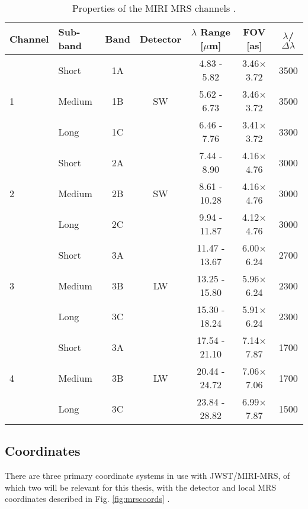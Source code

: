 \begin{table}[t]
	\begin{small}
	\centering
	\begin{tabular}{l|lc|cccc}
		\toprule
		\textbf{Channel} & \textbf{Sub-band} & \textbf{Band} & \textbf{Detector} & $\lambda$ \textbf{Range [$\mu$m]} & \textbf{FOV [as]} & $\lambda$/$\Delta\lambda$\\
		\midrule
		\multirow{3}{*}{1}  &Short & 1A & \multirow{3}{*}{SW}   & 4.83 - 5.82 & 3.46$\times$3.72 & 3500 \\
							&Medium & 1B &						& 5.62 - 6.73 & 3.46$\times$3.72 & 3500 \\
							& Long & 1C&						& 6.46 - 7.76 & 3.41$\times$3.72 & 3300 \\
		\midrule
		\multirow{3}{*}{2}  &Short & 2A & \multirow{3}{*}{SW}   & 7.44 - 8.90 & 4.16$\times$4.76 & 3000 \\
							&Medium & 2B &						& 8.61 - 10.28 & 4.16$\times$4.76 & 3000 \\
							& Long & 2C&						& 9.94 - 11.87 & 4.12$\times$4.76 & 3000 \\
		\midrule
		\multirow{3}{*}{3}  &Short & 3A & \multirow{3}{*}{LW}   & 11.47 - 13.67 & 6.00$\times$6.24 & 2700 \\
							&Medium & 3B &						& 13.25 - 15.80 & 5.96$\times$6.24 & 2300 \\
							& Long & 3C&						& 15.30 - 18.24 & 5.91$\times$6.24 & 2300 \\		
		\midrule
		\multirow{3}{*}{4}  &Short & 3A & \multirow{3}{*}{LW}   & 17.54 - 21.10 & 7.14$\times$7.87 & 1700 \\
							&Medium & 3B &						& 20.44 - 24.72 & 7.06$\times$7.06 & 1700 \\
							& Long & 3C&						& 23.84 - 28.82 & 6.99$\times$7.87 & 1500 \\			
		\bottomrule
	\end{tabular}
	\end{small}

	\caption{Properties of the MIRI MRS channels \parencite{MIRI6}.}
	\label{tab:mrs}
\end{table}

\parencite{Wells2015} %
\subsection{Coordinates}
There are three primary coordinate systems in use with JWST/MIRI-MRS, of which two will be relevant for this thesis, with the detector and local MRS coordinates described in Fig. \ref{fig:mrscoords} \parencite{Argyriou2020}.

